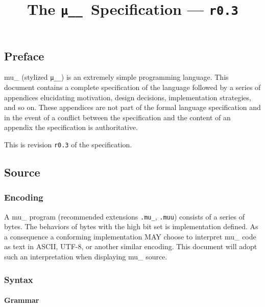 \documentclass[twocolumn]{report}
\newcommand\muu{\texttt{μ\!\!\!\_\_}}
\newcommand\rev{\texttt{r0.3} }
\begin{document}
\title{The \muu\ Specification --- \rev}

\makeatletter\chapter*{\@title}\makeatother
\label{ch:main}

\section*{Preface}
\label{sec:preface}

mu\_ (stylized \muu) is an extremely simple programming language.
This document contains a complete specification of the language followed by a series of appendices elucidating motivation, design decisions, implementation strategies, and so on.
These appendices are not part of the formal language specification and in the event of a conflict between the specification and the content of an appendix the specification is authoritative.

This is revision \rev of the specification.

\section{Source}
\label{sec:source}

\subsection{Encoding}
\label{subsec:encoding}

A mu\_ program (recommended extensions \texttt{.mu\_}, \texttt{.muu}) consists of a series of bytes.
The behaviors of bytes with the high bit set is implementation defined.
As a consequence a conforming implementation MAY choose to interpret mu\_ code as text in ASCII, UTF-8, or another similar encoding.
This document will adopt such an interpretation when displaying mu\_ source.

\subsection{Syntax}
\label{subsec:syntax}

\subsubsection{Grammar}
\label{subsubsec:grammar}
\end{document}
